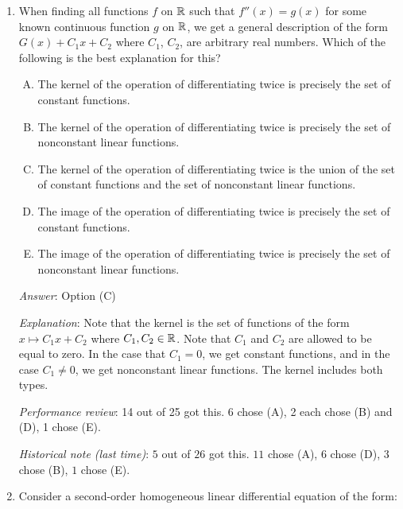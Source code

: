 \documentclass[10pt]{amsart}
\begin{document}
\begin{enumerate}
  {\em Answer}: Option (B)

  {\em Explanation}: This is obvious once you think about it.

  {\em Performance review}: 19 out of 25 got this. 4 chose (D), 2 chose (A).

  {\em Historical note (last time)}: $11$ out of $26$ got this. $7$ chose (C),
  $4$ chose (D), $3$ chose (A), $1$ chose (E).

\item When finding all functions $f$ on $\mathbb{R}$ such that $f''(x) = g(x)$
  for some known continuous function $g$ on $\mathbb{R}$, we get a general
  description of the form $G(x) + C_1x + C_2$ where $C_1$, $C_2$, are
  arbitrary real numbers. Which of the following is the best
  explanation for this?

  \begin{enumerate}[(A)]
  \item The kernel of the operation of differentiating twice is
    precisely the set of constant functions.
  \item The kernel of the operation of differentiating twice is
    precisely the set of nonconstant linear functions.
  \item The kernel of the operation of differentiating twice is the
    union of the set of constant functions and the set of nonconstant
    linear functions.
  \item The image of the operation of differentiating twice is
    precisely the set of constant functions.
  \item The image of the operation of differentiating twice is
    precisely the set of nonconstant linear functions.
  \end{enumerate}

  {\em Answer}: Option (C)

  {\em Explanation}: Note that the kernel is the set of functions of
  the form $x \mapsto C_1x + C_2$ where $C_1,C_2 \in \mathbb{R}$. Note that
  $C_1$ and $C_2$ are allowed to be equal to zero. In the case that
  $C_1 = 0$, we get constant functions, and in the case $C_1 \ne 0$,
  we get nonconstant linear functions. The kernel includes both types.

  {\em Performance review}: 14 out of 25 got this. 6 chose (A), 2 each
  chose (B) and (D), 1 chose (E).

  {\em Historical note (last time)}: $5$ out of $26$ got this. $11$ chose (A),
  $6$ chose (D), $3$ chose (B), $1$ chose (E).

\item Consider a second-order homogeneous linear differential equation
  of the form:


\end{enumerate}
\end{document}
